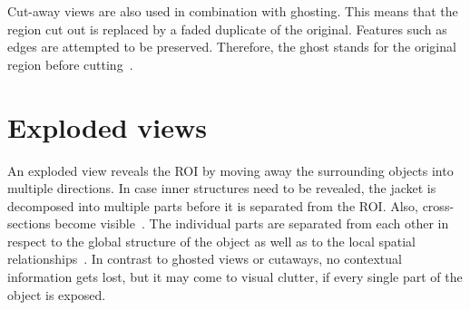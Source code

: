 Cut-away views are also used in combination with ghosting. This means that the region cut out is replaced by a faded duplicate of the original. Features such as edges are attempted to be preserved. Therefore, the ghost stands for the original region before cutting~\cite{proc:volumeshop}.

\section{Exploded views}
An exploded view reveals the ROI by moving away the surrounding objects into multiple directions. In case inner structures need to be revealed, the jacket is decomposed into multiple parts before it is separated from the ROI. Also, cross-sections become visible~\cite{jour:explodedView}. The individual parts are separated from each other in respect to the global structure of the object as well as to the local spatial relationships~\cite{jour:generationExplodedView}. In contrast to ghosted views or cutaways, no contextual information gets lost, but it may come to visual clutter, if every single part of the object is exposed.

